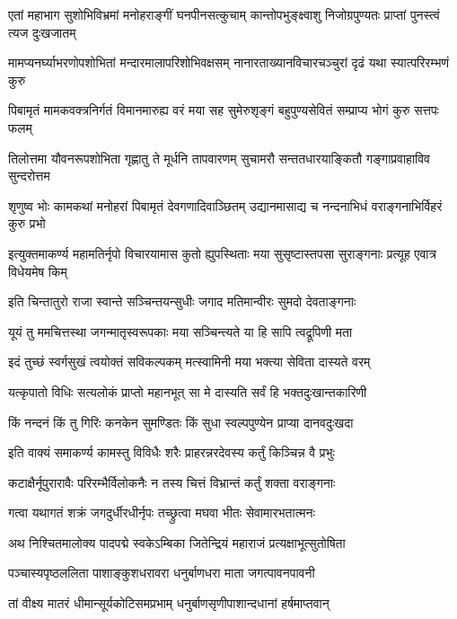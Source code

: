 \fourlineindentedshloka
{एतां महाभाग सुशोभिविभ्रमां}
{मनोहराङ्गीं घनपीनसत्कुचाम्}
{कान्तोपभुङ्क्ष्वाशु निजोग्रपुण्यतः}
{प्राप्तां पुनस्त्वं त्यज दुःखजातम्}%

\fourlineindentedshloka
{मामप्यनर्घ्याभरणोपशोभितां}
{मन्दारमालापरिशोभिवक्षसम्}
{नानारताख्यानविचारचञ्चुरां}
{दृढं यथा स्यात्परिरम्भणं कुरु}%

\fourlineindentedshloka
{पिबामृतं मामकवक्त्रनिर्गतं}
{विमानमारुह्य वरं मया सह}
{सुमेरुशृङ्गं बहुपुण्यसेवितं}
{सम्प्राप्य भोगं कुरु सत्तपः फलम्}%

\fourlineindentedshloka
{तिलोत्तमा यौवनरूपशोभिता}
{गृह्णातु ते मूर्धनि तापवारणम्}
{सुचामरौ सन्ततधारयाङ्कितौ}
{गङ्गाप्रवाहाविव सुन्दरोत्तम}%

\fourlineindentedshloka
{शृणुष्व भोः कामकथां मनोहरां}
{पिबामृतं देवगणादिवाञ्छितम्}
{उद्यानमासाद्य च नन्दनाभिधं}
{वराङ्गनाभिर्विहरं कुरु प्रभो}%

\fourlineindentedshloka
{इत्युक्तमाकर्ण्य महामतिर्नृपो}
{विचारयामास कुतो ह्युपस्थिताः}
{मया सुसृष्टास्तपसा सुराङ्गनाः}
{प्रत्यूह एवात्र विधेयमेष किम्}%

\twolineshloka
{इति चिन्तातुरो राजा स्वान्ते सञ्चिन्तयन्सुधीः}
{जगाद मतिमान्वीरः सुमदो देवताङ्गनाः}%

\twolineshloka
{यूयं तु ममचित्तस्था जगन्मातृस्वरूपकाः}
{मया सञ्चिन्त्यते या हि सापि त्वद्रूपिणी मता}%

\twolineshloka
{इदं तुच्छं स्वर्गसुखं त्वयोक्तं सविकल्पकम्}
{मत्स्वामिनी मया भक्त्या सेविता दास्यते वरम्}%

\twolineshloka
{यत्कृपातो विधिः सत्यलोकं प्राप्तो महानभूत्}
{सा मे दास्यति सर्वं हि भक्तदुःखान्तकारिणी}%

\twolineshloka
{किं नन्दनं किं तु गिरिः कनकेन सुमण्डितः}
{किं सुधा स्वल्पपुण्येन प्राप्या दानवदुःखदा}%

\twolineshloka
{इति वाक्यं समाकर्ण्य कामस्तु विविधैः शरैः}
{प्राहरन्नरदेवस्य कर्तुं किञ्चिन्न वै प्रभुः}%

\twolineshloka
{कटाक्षैर्नूपुरारावैः परिरम्भैर्विलोकनैः}
{न तस्य चित्तं विभ्रान्तं कर्तुं शक्ता वराङ्गनाः}%

\twolineshloka
{गत्वा यथागतं शक्रं जगदुर्धीरधीर्नृपः}
{तच्छ्रुत्वा मघवा भीतः सेवामारभतात्मनः}%

\twolineshloka
{अथ निश्चितमालोक्य पादपद्मे स्वकेऽम्बिका}
{जितेन्द्रियं महाराजं प्रत्यक्षाभूत्सुतोषिता}%

\twolineshloka
{पञ्चास्यपृष्ठललिता पाशाङ्कुशधरावरा}
{धनुर्बाणधरा माता जगत्पावनपावनी}%

\twolineshloka
{तां वीक्ष्य मातरं धीमान्सूर्यकोटिसमप्रभाम्}
{धनुर्बाणसृणीपाशान्दधानां हर्षमाप्तवान्}%

